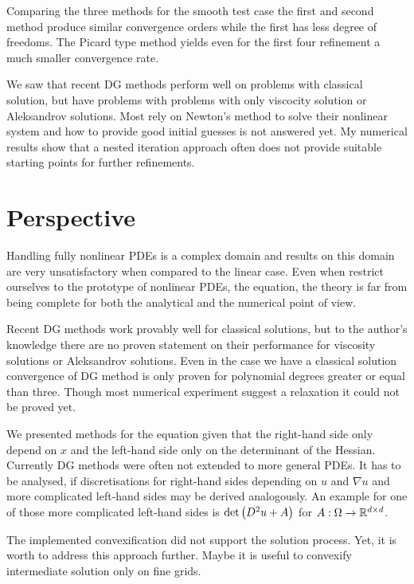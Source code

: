 Comparing the three methods for the smooth test case the first and second method produce similar convergence orders while the first has less degree of freedoms. The Picard type method yields even for the first four refinement a much smaller convergence rate.

We saw that recent DG methods perform well on problems with classical solution, but have problems with problems with only viscocity solution or Aleksandrov solutions. Most rely on Newton's method to solve their nonlinear system and how to provide good initial guesses is not answered yet.
My numerical results show that a nested iteration approach often does not provide suitable starting points for further refinements.

\section{Perspective}
Handling fully nonlinear PDEs is a complex domain and results on this domain are very unsatisfactory when compared to the linear case. Even when restrict ourselves to the prototype of nonlinear PDEs, the \MA equation, the theory is far from being complete for both the analytical and the numerical point of view.

Recent DG methods work provably well for classical solutions, but to the author's knowledge there are no proven statement on their performance for viscosity solutions or Aleksandrov solutions. Even in the case we have a classical solution convergence of DG method is only proven for polynomial degrees greater or equal than three. Though most numerical experiment suggest a relaxation it could not be proved yet.

We presented methods for the \MA equation given that the right-hand side only depend on $x$ and the left-hand side only on the determinant of the Hessian. Currently DG methods were often not extended to more general PDEs. It has to be analysed, if  discretisations for right-hand sides depending on $u$ and $\nabla u$ and more complicated left-hand sides may be derived analogously. An example for one of those more complicated left-hand sides is $\det{\left(D^2 u +A\right)}$ for $A:\Omega \rightarrow \mathbb{R}^{d \times d}$.
 
The implemented convexification did not support the solution process. Yet, it is worth to address this approach further. Maybe it is useful to convexify intermediate solution only on fine grids.


